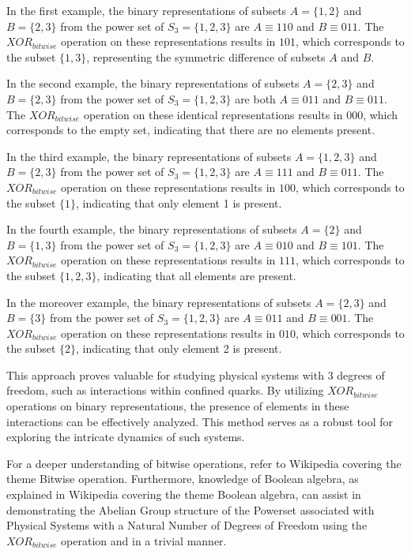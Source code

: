 \documentclass{article}
\begin{document}
In the first example, the binary representations of subsets $A=\{ 1,2 \}$ and $B=\{2,3\}$ from the power set of $S_3=\{1,2,3\}$ are $A\equiv110$ and $B\equiv011$. The $XOR_{bitwise}$ operation on these representations results in $101$, which corresponds to the subset $\{1,3\}$, representing the symmetric difference of subsets $A$ and $B$.

In the second example, the binary representations of subsets $A=\{2,3\}$ and $B=\{2,3\}$ from the power set of $S_3=\{1,2,3\}$ are both $A\equiv011$ and $B\equiv011$. The $XOR_{bitwise}$ operation on these identical representations results in $000$, which corresponds to the empty set, indicating that there are no elements present.

In the third example, the binary representations of subsets $A=\{1,2,3\}$ and $B=\{2,3\}$ from the power set of $S_3=\{1,2,3\}$ are $A\equiv111$ and $B\equiv011$. The $XOR_{bitwise}$ operation on these representations results in $100$, which corresponds to the subset $\{1\}$, indicating that only element 1 is present.

In the fourth example, the binary representations of subsets $A=\{2\}$ and $B=\{1,3\}$ from the power set of $S_3=\{1,2,3\}$ are $A\equiv 010$ and $B\equiv 101$. The $XOR_{bitwise}$ operation on these representations results in $111$, which corresponds to the subset $\{1,2,3\}$, indicating that all elements are present.

In the moreover example, the binary representations of subsets $A=\{2,3\}$ and $B=\{3\}$ from the power set of $S_3=\{1,2,3\}$ are $A \equiv 011 $ and $B\equiv 001$. The $XOR_{bitwise}$ operation on these representations results in $010$, which corresponds to the subset $\{2\}$, indicating that only element 2 is present.

This approach proves valuable for studying physical systems with 3 degrees of freedom, such as interactions within confined quarks. By utilizing $XOR_{bitwise}$ operations on binary representations, the presence of elements in these interactions can be effectively analyzed. This method serves as a robust tool for exploring the intricate dynamics of such systems.

For a deeper understanding of bitwise operations, refer to Wikipedia covering the theme Bitwise operation. 
Furthermore, knowledge of Boolean algebra, as explained in Wikipedia covering the theme Boolean algebra, 
can assist in demonstrating the Abelian Group structure of the Powerset associated with Physical Systems with a Natural Number of Degrees of Freedom using the $XOR_{bitwise}$ operation and in a trivial manner.
\end{document}
